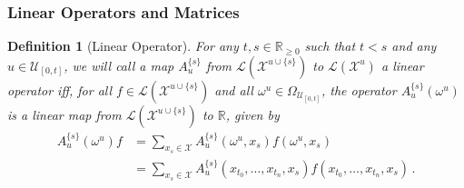 \documentclass[10pt]{paper}
\newtheorem{definition}{Definition}
\newcommand{\reals}{\mathbb{R}}
\newcommand{\realsnonneg}{\reals_{\geq 0}}
\newcommand{\states}{\mathcal{X}}
\newcommand{\gambles}{\mathcal{L}}
\begin{document}
\subsubsection{Linear Operators and Matrices}


\begin{definition}[Linear Operator]\label{def:multivariable_linear}
For any $t,s\in\realsnonneg$ such that $t<s$ and any $u\in\mathcal{U}_{[0,t]}$, we will call a map $A_u^{\{s\}}$ from $\gambles(\states^{u\cup\{s\}})$ to $\gambles(\states^u)$ a \emph{linear} operator iff, for all $f\in\gambles(\states^{u\cup\{s\}})$ and all $\omega^u\in\Omega_{\mathcal{U}_{[0,t]}}$, the operator $A_u^{\{s\}}(\omega^u)$ is a linear map from $\gambles(\states^{u\cup\{s\}})$ to $\reals$, given by
\begin{align*}
A_u^{\{s\}}(\omega^u)f &= \sum_{x_s\in\states} A_u^{\{s\}}(\omega^u,x_s)f(\omega^u,x_s) \\
 &= \sum_{x_s\in\states} A_u^{\{s\}}(x_{t_0},\ldots,x_{t_n},x_s)f(x_{t_0},\ldots,x_{t_n},x_s)\,.
\end{align*}
\end{definition}
\end{document}

